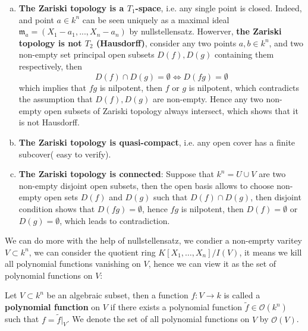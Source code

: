 \documentclass[12pt,a4paper]{article}
\begin{document}
\begin{enumerate}[(a)]
    \item\textbf{ The Zariski topology is a \(T_1\)-space}, i.e. any single point is closed. Indeed, and point \(a \in k^n\) can be seen uniquely as a maximal ideal \(\mathfrak{m}_a = (X_1 - a_1,...,X_n - a_n)\) by nullstellensatz. Howerver, \textbf{the Zariski topology is not \(T_2\) (Hausdorff)}, consider any two points \(a,b \in k^n\), and two non-empty set principal open subsets \(D(f), D(g)\) containing them respectively, then
    \[D(f) \cap D(g) = \emptyset \iff D(fg) = \emptyset\]
    which implies that \(fg\) is nilpotent, then \(f\) or \(g\) is nilpotent,
    which contradicts the assumption that \(D(f),D(g)\) are non-empty. Hence any two non-empty open subsets of Zariski topology always intersect, which shows that it is not Hausdorff.\\
    
    \item \textbf{The Zariski topology is quasi-compact}, i.e. any open cover has a finite subcover( easy to verify).
    
    \item \textbf{The Zariski topology is connected}: Suppose that \(k^n = U \cup V\) are two non-empty disjoint open subsets, then the open basis allows to choose non-empty open sets \(D(f)\) and \(D(g)\) such that \(D(f)\cap D(g)\), then disjoint condition shows that \(D(fg) = \emptyset\), hence \(fg\) is nilpotent, then \(D(f) =\emptyset\) or \(D(g) = \emptyset\), which leads to contradiction.
\end{enumerate}
\newpage
We can do more with the help of nullstellensatz, we condier a non-emprty varitey \(V \subset k^n\), we can consider the quotient ring \(K[X_1,\dots,X_n]/I(V)\), it means we kill all polynomial functions vanishing on \(V\), hence we can view it as the set of polynomial functions on \(V\):
\begin{definitionplain}
    Let \(V \subset k^n\) be an algebraic subset, then a function \(f: V \to k\) is called a \textbf{polynomial function} on \(V\) if there exists a polynomial function \(\tilde{f} \in \mathcal{O}(k^n)\) such that \(f = \tilde{f}|_V\). We denote the set of all polynomial functions on \(V\) by \(\mathcal{O}(V)\).\\
\end{definitionplain}
\end{document}
